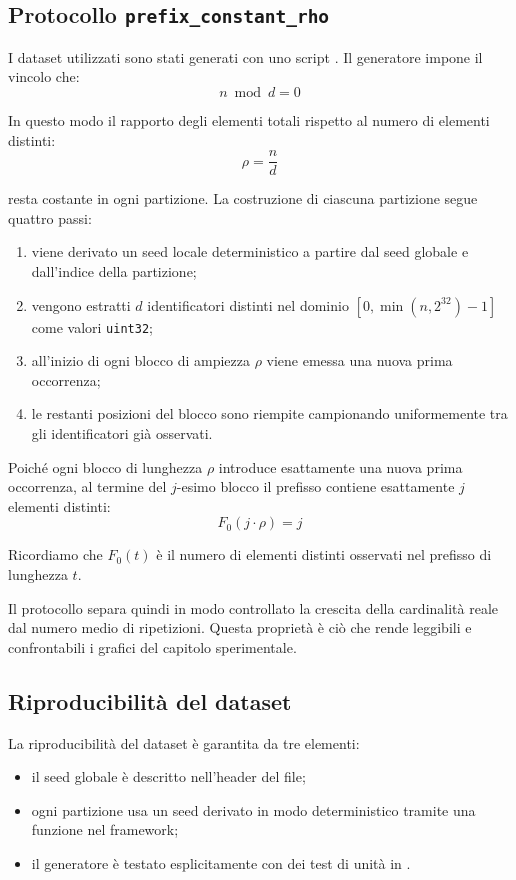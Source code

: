 \subsection{Protocollo \texttt{prefix\_constant\_rho}}
\label{sec:prefix-constant-rho}

I dataset utilizzati sono stati generati con uno script
. Il generatore
impone il vincolo che:
\[
n \bmod d = 0
\]

In questo modo il rapporto degli elementi totali rispetto al numero di elementi distinti:
\[
\rho=\frac{n}{d}
\]

resta costante in ogni partizione. La costruzione di ciascuna partizione segue
quattro passi:
\begin{enumerate}
    \item viene derivato un seed locale deterministico a partire dal seed
    globale e dall'indice della partizione;
    \item vengono estratti \(d\) identificatori distinti nel dominio
    \([0,\min(n,2^{32})-1]\) come valori \texttt{uint32};
    \item all'inizio di ogni blocco di ampiezza \(\rho\) viene emessa una nuova
    prima occorrenza;
    \item le restanti posizioni del blocco sono riempite campionando
    uniformemente tra gli identificatori già osservati.
\end{enumerate}

Poiché ogni blocco di lunghezza $\rho$ introduce esattamente una nuova prima
  occorrenza, al termine del $j$-esimo blocco il prefisso contiene esattamente
  $j$ elementi distinti:
  \[
  F_0(j \cdot \rho)=j
  \]

Ricordiamo che $F_0(t)$ \`e il numero di elementi distinti osservati nel prefisso di lunghezza $t$.

Il protocollo separa quindi in modo controllato la crescita della cardinalità
reale dal numero medio di ripetizioni. Questa proprietà è ciò che rende leggibili
e confrontabili i grafici del capitolo sperimentale.

\subsection{Riproducibilità del dataset}

La riproducibilità del dataset è garantita da tre elementi:
\begin{itemize}
    \item il seed globale è descritto nell'header del file;
    \item ogni partizione usa un seed derivato in modo deterministico tramite una funzione nel framework;
    \item il generatore è testato esplicitamente con dei test di unit\`a in
    .
\end{itemize}

